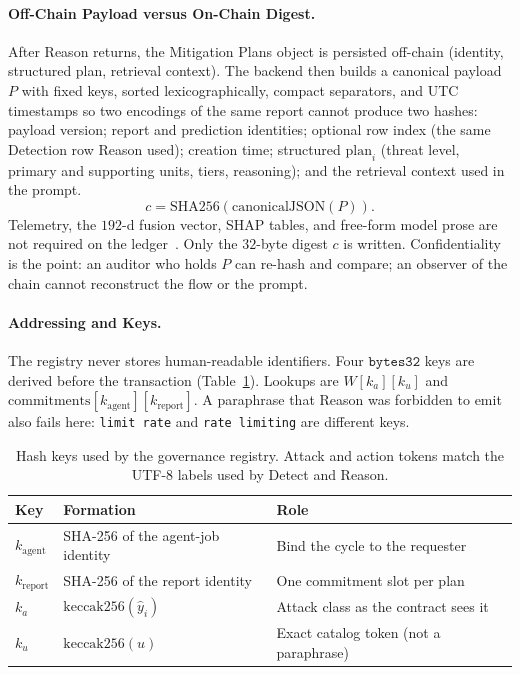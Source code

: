 \paragraph{Off-Chain Payload versus On-Chain Digest.}
After Reason returns, the Mitigation Plans object is persisted off-chain (identity, structured plan, retrieval context). The backend then builds a canonical payload $P$ with fixed keys, sorted lexicographically, compact separators, and UTC timestamps so two encodings of the same report cannot produce two hashes: payload version; report and prediction identities; optional row index (the same Detection row Reason used); creation time; structured $\mathrm{plan}_i$ (threat level, primary and supporting units, tiers, reasoning); and the retrieval context used in the prompt.
\begin{equation}
c = \mathrm{SHA256}(\mathrm{canonicalJSON}(P)).
\label{eq:commitment}
\end{equation}
Telemetry, the $192$-d fusion vector, SHAP tables, and free-form model prose are not required on the ledger~\cite{zhang2024exploit}. Only the $32$-byte digest $c$ is written. Confidentiality is the point: an auditor who holds $P$ can re-hash and compare; an observer of the chain cannot reconstruct the flow or the prompt.

\paragraph{Addressing and Keys.}
The registry never stores human-readable identifiers. Four $\mathtt{bytes32}$ keys are derived before the transaction (Table~\ref{tab:commit-keys}). Lookups are $W[k_a][k_u]$ and $\mathrm{commitments}[k_{\mathrm{agent}}][k_{\mathrm{report}}]$. A paraphrase that Reason was forbidden to emit also fails here: \texttt{limit rate} and \texttt{rate limiting} are different keys.

\begin{table}[t]
\caption{Hash keys used by the governance registry. Attack and action tokens match the UTF-8 labels used by Detect and Reason.}
\label{tab:commit-keys}
\centering
\begin{tabular}{p{}p{}p{}}
\hline
Key & Formation & Role \\
\hline
$k_{\mathrm{agent}}$ & SHA-256 of the agent-job identity & Bind the cycle to the requester \\
$k_{\mathrm{report}}$ & SHA-256 of the report identity & One commitment slot per plan \\
$k_a$ & $\mathrm{keccak256}(\hat{y}_i)$ & Attack class as the contract sees it \\
$k_u$ & $\mathrm{keccak256}(u)$ & Exact catalog token (not a paraphrase) \\
\hline
\end{tabular}
\end{table}

